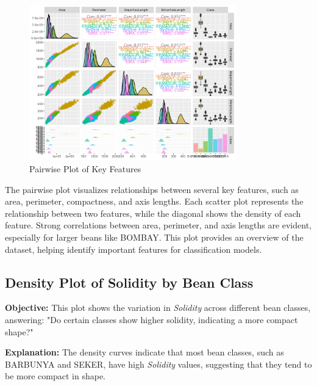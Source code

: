 \documentclass[a4paper,12pt]{article}
\begin{document}
\begin{figure}[H]
    \centering
    \includegraphics[width=0.8\textwidth]{graphs/pairwise_plot.png}
    \caption{Pairwise Plot of Key Features}
    \label{fig:pairwise_plot}
\end{figure}
The pairwise plot visualizes relationships between several key features, such as area, perimeter, compactness, and axis lengths. Each scatter plot represents the relationship between two features, while the diagonal shows the density of each feature. Strong correlations between area, perimeter, and axis lengths are evident, especially for larger beans like BOMBAY. This plot provides an overview of the dataset, helping identify important features for classification models.


\newpage


\subsection{Density Plot of Solidity by Bean Class}
\noindent\textbf{Objective:} This plot shows the variation in \textit{Solidity} across different bean classes, answering: "Do certain classes show higher solidity, indicating a more compact shape?"

\noindent\textbf{Explanation:} The density curves indicate that most bean classes, such as BARBUNYA and SEKER, have high \textit{Solidity} values, suggesting that they tend to be more compact in shape.
\end{document}
